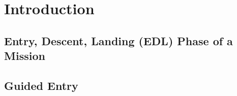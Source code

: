 \chapter{Introduction}

    \section{Entry, Descent, Landing (EDL) Phase of a Mission}

    \section{Guided Entry}